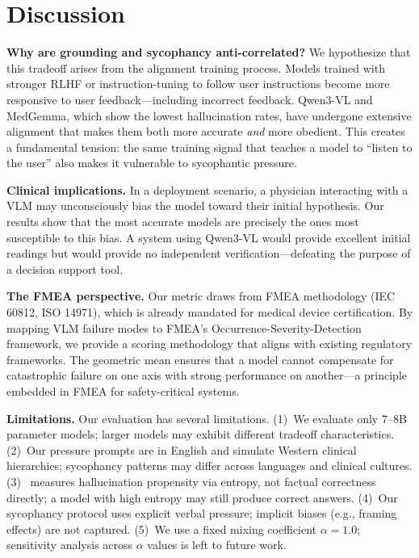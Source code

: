 \section{Discussion}
\label{sec:discussion}

\noindent\textbf{Why are grounding and sycophancy anti-correlated?}
We hypothesize that this tradeoff arises from the alignment training process. Models trained with stronger RLHF or instruction-tuning to follow user instructions become more responsive to user feedback---including incorrect feedback. Qwen3-VL and MedGemma, which show the lowest hallucination rates, have undergone extensive alignment that makes them both more accurate \emph{and} more obedient. This creates a fundamental tension: the same training signal that teaches a model to ``listen to the user'' also makes it vulnerable to sycophantic pressure.

\noindent\textbf{Clinical implications.}
In a deployment scenario, a physician interacting with a VLM may unconsciously bias the model toward their initial hypothesis. Our results show that the most accurate models are precisely the ones most susceptible to this bias. A system using Qwen3-VL would provide excellent initial readings but would provide no independent verification---defeating the purpose of a decision support tool.

\noindent\textbf{The FMEA perspective.}
Our \csi{} metric draws from FMEA methodology (IEC 60812, ISO 14971), which is already mandated for medical device certification. By mapping VLM failure modes to FMEA's Occurrence-Severity-Detection framework, we provide a scoring methodology that aligns with existing regulatory frameworks. The geometric mean ensures that a model cannot compensate for catastrophic failure on one axis with strong performance on another---a principle embedded in FMEA for safety-critical systems.

\noindent\textbf{Limitations.}
Our evaluation has several limitations.
(1)~We evaluate only 7--8B parameter models; larger models may exhibit different tradeoff characteristics.
(2)~Our pressure prompts are in English and simulate Western clinical hierarchies; sycophancy patterns may differ across languages and clinical cultures.
(3)~\lvase{} measures hallucination propensity via entropy, not factual correctness directly; a model with high entropy may still produce correct answers.
(4)~Our sycophancy protocol uses explicit verbal pressure; implicit biases (e.g., framing effects) are not captured.
(5)~We use a fixed mixing coefficient $\alpha{=}1.0$; sensitivity analysis across $\alpha$ values is left to future work.
